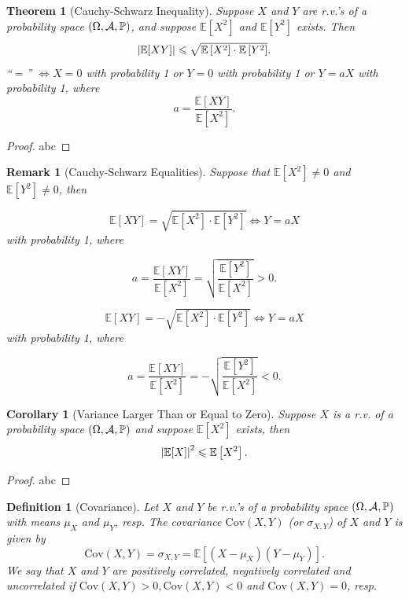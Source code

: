 \documentclass[openany,12pt]{book}
\newtheorem{theorem}{Theorem}[chapter]
\newtheorem{corollary}{Corollary}[chapter]
\newtheorem{remark}{Remark}[chapter]
\newtheorem{definition}{Definition}[chapter]
\begin{document}
\begin{theorem}[Cauchy-Schwarz Inequality]
  Suppose $X$ and $Y$ are r.v.'s of a probability space $(\Omega,\mathcal{A},\mathbb{P})$, and suppose $\mathbb{E}[ X^{2}]$ and $\mathbb{E}[ Y^{2}]$
  exists. Then
  \[\left| \mathbb{E}[XY] \right| \leqslant \sqrt{\mathbb{E}\left[ X^{2} \right] \cdot \mathbb{E}\left[ Y^{2} \right]}.\]
  ``$=$''  $\Leftrightarrow X = 0$ with probability 1 or $Y = 0$ with probability 1 or $Y = aX$ with probability 1, where
  \[a = \frac{\mathbb{E}[XY]}{\mathbb{E}\left[ X^{2} \right]}.\]
\end{theorem}

\begin{proof}
  abc
\end{proof}

\begin{remark}[Cauchy-Schwarz Equalities]
  Suppose that $\mathbb{E}[ X^{2}] \neq 0$ and $\mathbb{E}[ Y^{2}] \neq 0$, then

  \[\mathbb{E}[XY]= \sqrt{\mathbb{E}\left[ X^{2} \right] \cdot \mathbb{E}\left[ Y^{2} \right]}  \Leftrightarrow Y = aX\]
  with probability 1, where

  \[a = \frac{\mathbb{E}[XY]}{\mathbb{E}\left[ X^{2} \right]} = \sqrt{\frac{\mathbb{E}\left[ Y^{2} \right]}{\mathbb{E}\left[ X^{2} \right]}} > 0.\]

  \[\mathbb{E}[XY]= - \sqrt{\mathbb{E}\left[ X^{2} \right] \cdot \mathbb{E}\left[ Y^{2} \right]}  \Leftrightarrow Y = aX\]
  with probability 1, where

  \[a = \frac{\mathbb{E}[XY]}{\mathbb{E}\left[ X^{2} \right]} = - \sqrt{\frac{\mathbb{E}\left[ Y^{2} \right]}{\mathbb{E}\left[ X^{2} \right]}} < 0.\]

\end{remark}

\begin{corollary}[Variance Larger Than or Equal to Zero]
  Suppose $X$ is a r.v. of a probability space $(\Omega,\mathcal{A},\mathbb{P})$ and suppose
  $\mathbb{E}[ X^{2}]$ exists, then
  \[\left| \mathbb{E}[X] \right|^{2} \leqslant \mathbb{E}\left[ X^{2} \right].\]
\end{corollary}

\begin{proof}
  abc
\end{proof}

\begin{definition}[Covariance]
  Let $X$ and $Y$ be r.v.'s of a probability space $(\Omega,\mathcal{A},\mathbb{P})$ with means $\mu_{X}$ and $\mu_{Y}$, resp. The covariance $\mathrm{Cov}(X,Y)$ (or $\sigma_{X,Y}$) of $X$ and $Y$ is given by
  \[\mathrm{Cov}(X,Y)= \sigma_{X,Y} = \mathbb{E}\left[ \left( X - \mu_{X} \right)\left( Y - \mu_{Y} \right) \right].\]
  We say that $X$ and $Y$ are positively correlated, negatively correlated and uncorrelated if
  $\mathrm{Cov}(X,Y) > 0, \mathrm{Cov}(X,Y) < 0$ and
  $\mathrm{Cov}(X,Y)= 0$, resp.
\end{definition}
\end{document}
